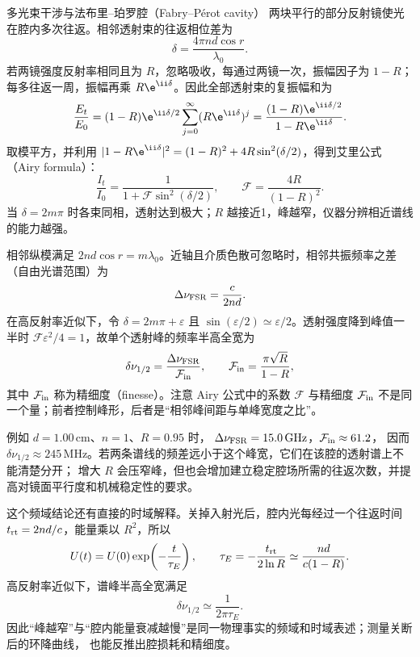 \begin{starread}{多光束干涉与法布里--珀罗腔（Fabry--P\'erot cavity）}
两块平行的部分反射镜使光在腔内多次往返。相邻透射束的往返相位差为
\[
 \delta=\frac{4\pi nd\cos r}{\lambda_0}.
\]
若两镜强度反射率相同且为 $R$，忽略吸收，每通过两镜一次，振幅因子为 $1-R$；
每多往返一周，振幅再乘 $R\e^{\ii\delta}$。因此全部透射束的复振幅和为
\[
 \frac{E_t}{E_0}
 =(1-R)\e^{\ii\delta/2}
 \sum_{j=0}^{\infty}(R\e^{\ii\delta})^j
 =\frac{(1-R)\e^{\ii\delta/2}}{1-R\e^{\ii\delta}}.
\]
取模平方，并利用
$|1-R\e^{\ii\delta}|^2=(1-R)^2+4R\sin^2(\delta/2)$，得到艾里公式（Airy formula）：
\[
 \frac{I_t}{I_0}=\frac1{1+\mathcal F\sin^2(\delta/2)},
 \qquad \mathcal F=\frac{4R}{(1-R)^2}.
\]
当 $\delta=2m\pi$ 时各束同相，透射达到极大；$R$ 越接近1，峰越窄，仪器分辨相近谱线的能力越强。

\begin{center}
\end{center}

相邻纵模满足 $2nd\cos r=m\lambda_0$。近轴且介质色散可忽略时，相邻共振频率之差（自由光谱范围）为
\[
 \Delta\nu_{\rm FSR}=\frac{c}{2nd}.
\]
在高反射率近似下，令 $\delta=2m\pi+\varepsilon$ 且
$\sin(\varepsilon/2)\simeq\varepsilon/2$。透射强度降到峰值一半时
$\mathcal F\varepsilon^2/4=1$，故单个透射峰的频率半高全宽为
\[
 \delta\nu_{1/2}=\frac{\Delta\nu_{\rm FSR}}{\mathcal F_{\rm in}},
 \qquad
 \mathcal F_{\rm in}=\frac{\pi\sqrt R}{1-R},
\]
其中 $\mathcal F_{\rm in}$ 称为精细度（finesse）。注意 Airy 公式中的系数 $\mathcal F$ 与精细度
$\mathcal F_{\rm in}$ 不是同一个量；前者控制峰形，后者是“相邻峰间距与单峰宽度之比”。

例如 $d=1.00\,\mathrm{cm}$、$n=1$、$R=0.95$ 时，
$\Delta\nu_{\rm FSR}=15.0\,\mathrm{GHz}$，$\mathcal F_{\rm in}\approx61.2$，
因而 $\delta\nu_{1/2}\approx245\,\mathrm{MHz}$。若两条谱线的频差远小于这个峰宽，它们在该腔的透射谱上不能清楚分开；
增大 $R$ 会压窄峰，但也会增加建立稳定腔场所需的往返次数，并提高对镜面平行度和机械稳定性的要求。

这个频域结论还有直接的时域解释。关掉入射光后，腔内光每经过一个往返时间
$t_{\rm rt}=2nd/c$，能量乘以 $R^2$，所以
\[
 U(t)=U(0)\exp\!\left(-\frac{t}{\tau_E}\right),
 \qquad
 \tau_E=-\frac{t_{\rm rt}}{2\ln R}
 \simeq\frac{nd}{c(1-R)}.
\]
高反射率近似下，谱峰半高全宽满足
\[
 \boxed{\delta\nu_{1/2}\simeq\frac1{2\pi\tau_E}}.
\]
因此“峰越窄”与“腔内能量衰减越慢”是同一物理事实的频域和时域表述；测量关断后的环降曲线，
也能反推出腔损耗和精细度。
\end{starread}
